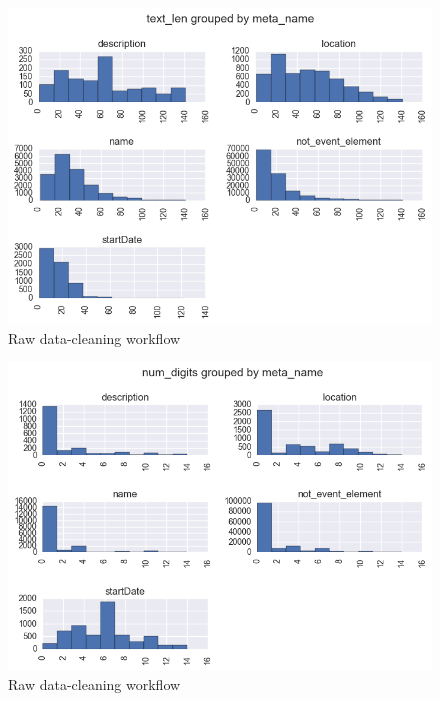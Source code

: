 \begin{figure}[h]
\begin{center}
\includegraphics[width=1.0\textwidth]{figures07/distrTextByMeta}
\caption{Raw data-cleaning workflow}
\label{fig:distrTextByMeta}
\end{center}
\end{figure}

\begin{figure}[h]
\begin{center}
\includegraphics[width=1.0\textwidth]{figures07/distrDigitsByMeta}
\caption{Raw data-cleaning workflow}
\label{fig:distrDigitsByMeta}
\end{center}
\end{figure}



